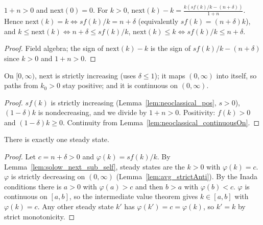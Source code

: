 \begin{lemma}
\label{lem:solow_next_sub_self}
\leanok
{}
$1 + n > 0$ and $\mathrm{next}(0) = 0$. For $k > 0$,
$\mathrm{next}(k) - k = \frac{k (s f(k)/k - (n + \delta))}{1 + n}$. Hence
$\mathrm{next}(k) = k \iff s f(k)/k = n + \delta$ (equivalently $s f(k) = (n + \delta) k$), and
$k \le \mathrm{next}(k) \iff n + \delta \le s f(k)/k$, $\mathrm{next}(k) \le k \iff s f(k)/k \le n + \delta$.
\end{lemma}
\begin{proof}
\leanok
Field algebra; the sign of $\mathrm{next}(k) - k$ is the sign of $s f(k)/k - (n + \delta)$ since
$k > 0$ and $1 + n > 0$.
\end{proof}

\begin{lemma}
\label{lem:solow_next_mono}
\leanok
{}
On $[0, \infty)$, $\mathrm{next}$ is strictly increasing (uses $\delta \le 1$); it maps $(0, \infty)$ into
itself, so paths from $k_0 > 0$ stay positive; and it is continuous on $(0, \infty)$.
\end{lemma}
\begin{proof}
\leanok
$s f(k)$ is strictly increasing (Lemma~\ref{lem:neoclassical_pos}, $s > 0$), $(1 - \delta) k$ is
nondecreasing, and we divide by $1 + n > 0$. Positivity: $f(k) > 0$ and $(1 - \delta) k \ge 0$.
Continuity from Lemma~\ref{lem:neoclassical_continuousOn}.
\end{proof}

\begin{theorem}
\label{thm:solow_existsUnique}
\leanok
{}
There is exactly one steady state.
\end{theorem}
\begin{proof}
\leanok
Let $c = n + \delta > 0$ and $\varphi(k) = s f(k)/k$. By Lemma~\ref{lem:solow_next_sub_self}, steady states
are the $k > 0$ with $\varphi(k) = c$. $\varphi$ is strictly decreasing on $(0, \infty)$
(Lemma~\ref{lem:avg_strictAnti}). By the Inada conditions there is $a > 0$ with $\varphi(a) > c$ and then
$b > a$ with $\varphi(b) < c$. $\varphi$ is continuous on $[a, b]$, so the intermediate value theorem gives
$k \in [a, b]$ with $\varphi(k) = c$. Any other steady state $k'$ has $\varphi(k') = c = \varphi(k)$, so
$k' = k$ by strict monotonicity.
\end{proof}

